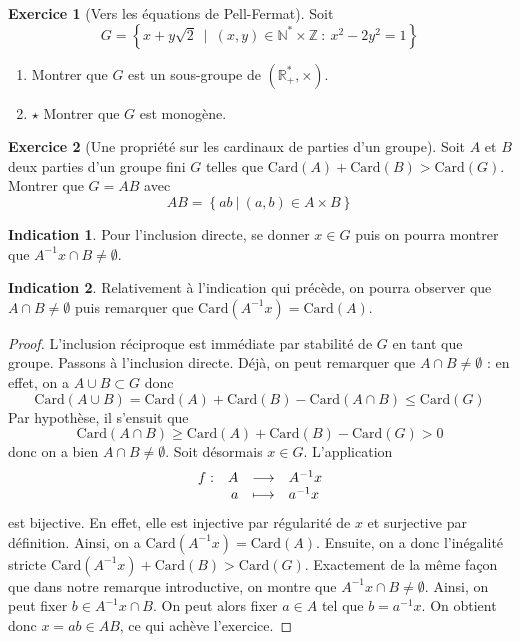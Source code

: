 \documentclass[french]{book}
\newcommand{\N}{\mathbb{N}}
\newcommand{\Z}{\mathbb{Z}}
\newcommand{\R}{\mathbb{R}}
\newcommand{\st}{^*}
\newcommand{\inv}{^{-1}}
\newcommand{\card}{\text{Card}}
\theoremstyle{definition}
\newtheorem{ex}{Exercice}[chapter]
\theoremstyle{theorem}
\newtheorem*{ind}{Indication}
\theoremstyle{remark}
\begin{document}
\begin{ex}[Vers les équations de Pell-Fermat]
	Soit $$G=\left\{x+y\sqrt{2}\ \mid \ (x,y)\in\N\st\times\Z\ : \ x^2-2y^2=1\right\}$$
	\begin{enumerate}
		\item Montrer que $G$ est un sous-groupe de $(\R_+\st,\times)$.
		\item $\star$ Montrer que $G$ est monogène.
	\end{enumerate}
\end{ex}

\begin{ex}[Une propriété sur les cardinaux de parties d'un groupe]
	Soit $A$ et $B$ deux parties d'un groupe fini $G$ telles que $\card(A)+\card(B)>\card(G)$. Montrer que $G=AB$ avec $$AB=\left\{ab \ |\ (a,b)\in A\times B\right\}$$
\end{ex}

\begin{ind}
	Pour l'inclusion directe, se donner $x \in G$ puis on pourra montrer que $A\inv x \cap B \ne \emptyset$.
\end{ind}

\begin{ind}
	Relativement à l'indication qui précède, on pourra observer que $A\cap B \ne \emptyset$ puis remarquer que $\card(A\inv x) = \card(A)$.
\end{ind}

\begin{proof}
	L'inclusion réciproque est immédiate par stabilité de $G$ en tant que groupe. Passons à l'inclusion directe. Déjà, on peut remarquer que $A\cap B \ne \emptyset$ : en effet, on a $A\cup B \subset G$ donc $$\card(A\cup B)=\card(A)+\card(B)-\card(A\cap B) \leqslant\card(G)$$ Par hypothèse, il s'ensuit que $$\card(A\cap B) \geqslant \card(A)+\card(B)-\card(G)>0$$ donc on a bien $A\cap B \ne \emptyset$. Soit désormais $x \in G$. L'application $$
	\begin{array}[t]{lrcl}
		f : & A & \longrightarrow & A\inv x \\
		& a & \longmapsto & a\inv x
	\end{array}
	$$ est bijective. En effet, elle est injective par régularité de $x$ et surjective par définition. Ainsi, on a $\card(A\inv x)=\card(A)$. Ensuite, on a donc l'inégalité stricte $\card(A\inv x)+\card(B) > \card(G)$. Exactement de la même façon que dans notre remarque introductive, on montre que $A\inv x \cap B \ne \emptyset$. Ainsi, on peut fixer $b \in A\inv x \cap B$. On peut alors fixer $a \in A$ tel que $b=a\inv x$. On obtient donc $x=ab \in AB$, ce qui achève l'exercice.
\end{proof}
\end{document}
